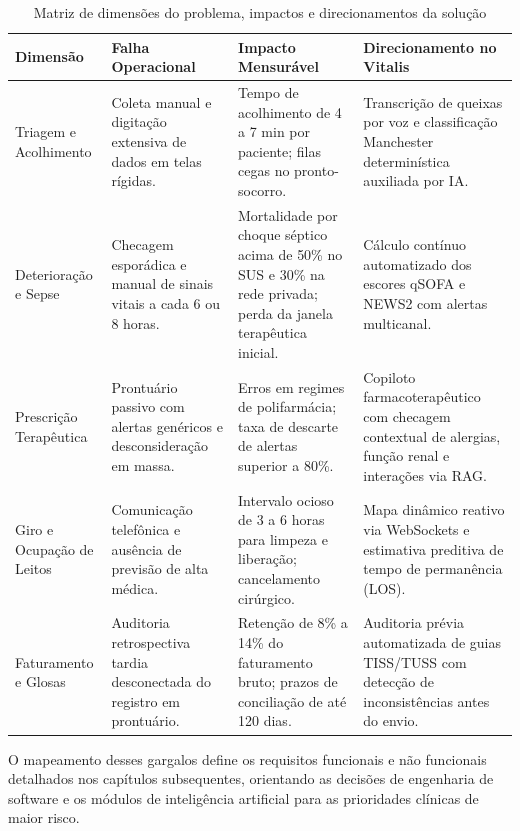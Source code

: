 \begin{table}[H]
\centering
\small
\caption{Matriz de dimensões do problema, impactos e direcionamentos da solução}
\label{tab:dimensoes_problema}
\begin{tabularx}{\textwidth}{>{\raggedright\arraybackslash}p{2.8cm} >{\raggedright\arraybackslash}p{3.6cm} >{\raggedright\arraybackslash}p{3.8cm} >{\raggedright\arraybackslash}X}
\toprule
\textbf{Dimensão} & \textbf{Falha Operacional} & \textbf{Impacto Mensurável} & \textbf{Direcionamento no Vitalis} \\
\midrule
Triagem e Acolhimento &
Coleta manual e digitação extensiva de dados em telas rígidas. &
Tempo de acolhimento de 4 a 7 min por paciente; filas cegas no pronto-socorro. &
Transcrição de queixas por voz e classificação Manchester determinística auxiliada por IA. \\
\addlinespace
Deterioração e Sepse &
Checagem esporádica e manual de sinais vitais a cada 6 ou 8 horas. &
Mortalidade por choque séptico acima de 50\% no SUS e 30\% na rede privada; perda da janela terapêutica inicial. &
Cálculo contínuo automatizado dos escores qSOFA e NEWS2 com alertas multicanal. \\
\addlinespace
Prescrição Terapêutica &
Prontuário passivo com alertas genéricos e desconsideração em massa. &
Erros em regimes de polifarmácia; taxa de descarte de alertas superior a 80\%. &
Copiloto farmacoterapêutico com checagem contextual de alergias, função renal e interações via RAG. \\
\addlinespace
Giro e Ocupação de Leitos &
Comunicação telefônica e ausência de previsão de alta médica. &
Intervalo ocioso de 3 a 6 horas para limpeza e liberação; cancelamento cirúrgico. &
Mapa dinâmico reativo via WebSockets e estimativa preditiva de tempo de permanência (LOS). \\
\addlinespace
Faturamento e Glosas &
Auditoria retrospectiva tardia desconectada do registro em prontuário. &
Retenção de 8\% a 14\% do faturamento bruto; prazos de conciliação de até 120 dias. &
Auditoria prévia automatizada de guias TISS/TUSS com detecção de inconsistências antes do envio. \\
\bottomrule
\end{tabularx}
\end{table}

O mapeamento desses gargalos define os requisitos funcionais e não funcionais detalhados nos capítulos subsequentes, orientando as decisões de engenharia de software e os módulos de inteligência artificial para as prioridades clínicas de maior risco.
